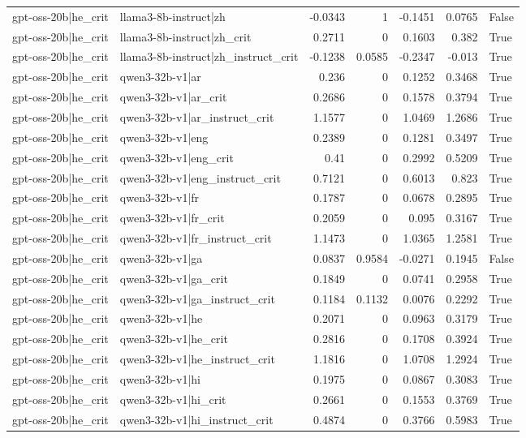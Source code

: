\begin{table}
\begin{tabular}{l l r r r r l}
gpt-oss-20b|he_crit & llama3-8b-instruct|zh & -0.0343 & 1 & -0.1451 & 0.0765 & False \\
gpt-oss-20b|he_crit & llama3-8b-instruct|zh_crit & 0.2711 & 0 & 0.1603 & 0.382 & True \\
gpt-oss-20b|he_crit & llama3-8b-instruct|zh_instruct_crit & -0.1238 & 0.0585 & -0.2347 & -0.013 & True \\
gpt-oss-20b|he_crit & qwen3-32b-v1|ar & 0.236 & 0 & 0.1252 & 0.3468 & True \\
gpt-oss-20b|he_crit & qwen3-32b-v1|ar_crit & 0.2686 & 0 & 0.1578 & 0.3794 & True \\
gpt-oss-20b|he_crit & qwen3-32b-v1|ar_instruct_crit & 1.1577 & 0 & 1.0469 & 1.2686 & True \\
gpt-oss-20b|he_crit & qwen3-32b-v1|eng & 0.2389 & 0 & 0.1281 & 0.3497 & True \\
gpt-oss-20b|he_crit & qwen3-32b-v1|eng_crit & 0.41 & 0 & 0.2992 & 0.5209 & True \\
gpt-oss-20b|he_crit & qwen3-32b-v1|eng_instruct_crit & 0.7121 & 0 & 0.6013 & 0.823 & True \\
gpt-oss-20b|he_crit & qwen3-32b-v1|fr & 0.1787 & 0 & 0.0678 & 0.2895 & True \\
gpt-oss-20b|he_crit & qwen3-32b-v1|fr_crit & 0.2059 & 0 & 0.095 & 0.3167 & True \\
gpt-oss-20b|he_crit & qwen3-32b-v1|fr_instruct_crit & 1.1473 & 0 & 1.0365 & 1.2581 & True \\
gpt-oss-20b|he_crit & qwen3-32b-v1|ga & 0.0837 & 0.9584 & -0.0271 & 0.1945 & False \\
gpt-oss-20b|he_crit & qwen3-32b-v1|ga_crit & 0.1849 & 0 & 0.0741 & 0.2958 & True \\
gpt-oss-20b|he_crit & qwen3-32b-v1|ga_instruct_crit & 0.1184 & 0.1132 & 0.0076 & 0.2292 & True \\
gpt-oss-20b|he_crit & qwen3-32b-v1|he & 0.2071 & 0 & 0.0963 & 0.3179 & True \\
gpt-oss-20b|he_crit & qwen3-32b-v1|he_crit & 0.2816 & 0 & 0.1708 & 0.3924 & True \\
gpt-oss-20b|he_crit & qwen3-32b-v1|he_instruct_crit & 1.1816 & 0 & 1.0708 & 1.2924 & True \\
gpt-oss-20b|he_crit & qwen3-32b-v1|hi & 0.1975 & 0 & 0.0867 & 0.3083 & True \\
gpt-oss-20b|he_crit & qwen3-32b-v1|hi_crit & 0.2661 & 0 & 0.1553 & 0.3769 & True \\
gpt-oss-20b|he_crit & qwen3-32b-v1|hi_instruct_crit & 0.4874 & 0 & 0.3766 & 0.5983 & True \\

\end{tabular}
\end{table}
